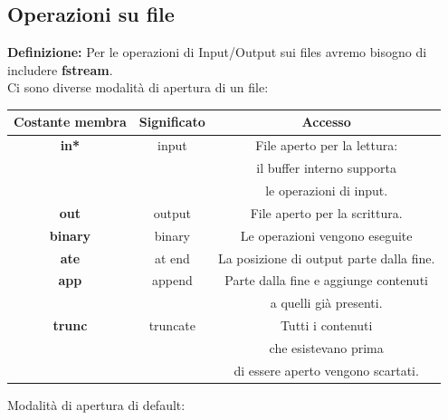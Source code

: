 \subsection{Operazioni su file}

\textsf{\small \textbf{Definizione: } Per le operazioni di Input/Output sui files avremo bisogno di includere \textbf{fstream}.} \\

\textsf{\small Ci sono diverse modalità di apertura di un file: } \\

\begin{tabular}{|c|c|c|}
	\hline
	\textbf{Costante membra} & \textbf{Significato} & \textbf{Accesso} \\
	\hline
	\textsf{\small \textbf{in*}} & \textsf{\small input} & \textsf{\small File aperto per la lettura: } \\
	\textsf{\small \textbf{}} & \textsf{\small } & \textsf{\small il buffer interno supporta } \\
	\textsf{\small \textbf{}} & \textsf{\small } & \textsf{\small le operazioni di input.} \\
	\hline
	\textsf{\small \textbf{out}} & \textsf{\small output} & \textsf{\small File aperto per la scrittura.} \\
	\hline
	\textsf{\small \textbf{binary}} & \textsf{\small binary} & \textsf{\small Le operazioni vengono eseguite} \\
	\hline
	\textsf{\small \textbf{ate}} & \textsf{\small at end} & \textsf{\small La posizione di output parte dalla fine.} \\
	\hline
	\textsf{\small \textbf{app}} & \textsf{\small append} & \textsf{\small Parte dalla fine e aggiunge contenuti } \\
	\textsf{\small \textbf{}} & \textsf{\small } & \textsf{\small a quelli già presenti.} \\
	\hline
	\textsf{\small \textbf{trunc}} & \textsf{\small truncate} & \textsf{\small Tutti i contenuti } \\
	\textsf{\small \textbf{}} & \textsf{\small } & \textsf{\small che esistevano prima } \\
	\textsf{\small \textbf{}} & \textsf{\small } & \textsf{\small di essere aperto vengono scartati.} \\
	\hline
\end{tabular} \break

\textsf{\small Modalità di apertura di default: } \\

